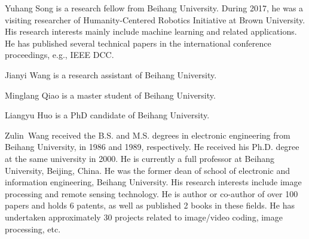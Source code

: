 \documentclass[10pt,journal,compsoc]{IEEEtran}
\begin{document}
\begin{IEEEbiography}{Yuhang Song} is a research fellow from Beihang University. During 2017, he was a visiting researcher of Humanity-Centered Robotics Initiative at Brown University. His research interests mainly include machine learning and related applications. He has published several technical papers in the international conference proceedings, e.g., IEEE DCC.
\end{IEEEbiography}

\begin{IEEEbiographynophoto}{Jianyi Wang}
is a research assistant of Beihang University.
\end{IEEEbiographynophoto}

\begin{IEEEbiographynophoto}{Minglang Qiao}
is a master student of Beihang University.
\end{IEEEbiographynophoto}

\begin{IEEEbiographynophoto}{Liangyu Huo}
is a PhD candidate of Beihang University.
\end{IEEEbiographynophoto}

\begin{IEEEbiography}{Zulin~Wang}
received the B.S. and M.S. degrees in electronic engineering from Beihang
University, in 1986 and 1989, respectively. He received his Ph.D. degree at the same university
in 2000. He is currently a full professor at Beihang University, Beijing, China. He was the former dean of school of electronic and information engineering, Beihang
University. His research interests include image processing and remote sensing
technology. He is author or co-author of over 100 papers and holds 6 patents, as well as published 2 books in these fields. He has
undertaken approximately 30 projects related to image/video coding, image processing, etc.
\end{IEEEbiography}
\end{document}
